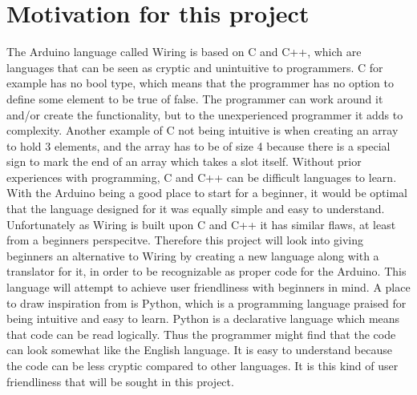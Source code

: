 \section{Motivation for this project}\label{introduction:motivation}
The Arduino language called Wiring is based on C and C++, which are languages that can be seen as cryptic and unintuitive to programmers. C for example has no bool type, which means that the programmer has no option to define some element to be true of false. The programmer can work around it and/or create the functionality, but to the unexperienced programmer it adds to complexity. Another example of C not being intuitive is when creating an array to hold 3 elements, and the array has to be of size 4 because there is a special sign to mark the end of an array which takes a slot itself.  Without prior experiences with programming, C and C++ can be difficult languages to learn. \\

With the Arduino being a good place to start for a beginner, it would be optimal that the language designed for it was equally simple and easy to understand. Unfortunately as Wiring is built upon C and C++ it has similar flaws, at least from a beginners perspecitve. Therefore this project will look into giving beginners an alternative to Wiring by creating a new language along with a translator for it, in order to be recognizable as proper code for the Arduino. This language will attempt to achieve user friendliness with beginners in mind. A place to draw inspiration from is Python, which is a programming language praised for being intuitive and easy to learn.  Python is a declarative language which means that code can be read logically.  Thus the programmer might find that the code can look somewhat like the English language. It is easy to understand because the code can be less cryptic compared to other languages. It is this kind of user friendliness that will be sought in this project.